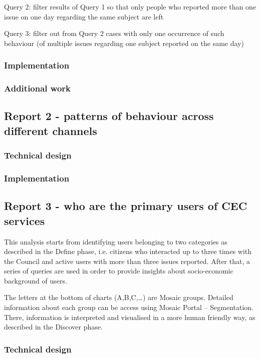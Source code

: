 Query 2: filter results of Query 1 so that only people who reported more than one issue on one day regarding the same subject are left

Query 3: filter out from Query 2 cases with only one occurrence of such behaviour (of multiple issues regarding one subject reported on the same day)

			\subsubsection{Implementation}
			
			\subsubsection{Additional work}
			
		\subsection{Report 2 - patterns of behaviour across different channels}
		
			\subsubsection{Technical design}
			
			\subsubsection{Implementation}
			
		\subsection{Report 3 - who are the primary users of CEC services}
		
This analysis starts from identifying users belonging to two categories as described in the Define phase, i.e. citizens who interacted up to three times with the Council and active users with more than three issues reported. After that, a series of queries are used in order to provide insights about socio-economic background of users.

The letters at the bottom of charts (A,B,C,…) are Mosaic groups. Detailed information about each group can be access using Mosaic Portal – Segmentation. There, information is interpreted and visualised in a more human friendly way, as described in the Discover phase.

			\subsubsection{Technical design}
			
